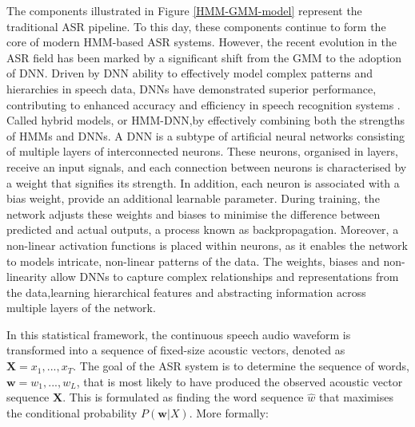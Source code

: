 The components illustrated in Figure \ref{HMM-GMM-model} represent the traditional \ac{ASR} pipeline. To this day, these components continue to form the core of modern \ac{HMM}-based \ac{ASR} systems. However, the recent evolution in the \ac{ASR} field has been marked by a significant shift from the \ac{GMM} to the adoption of \ac{DNN}. Driven by \ac{DNN} ability to effectively model complex patterns and hierarchies in speech data, \acp{DNN} have demonstrated superior performance, contributing to enhanced accuracy and efficiency in speech recognition systems \cite{hmm-dnn}. Called hybrid models, or \ac{HMM-DNN},by effectively combining both the strengths of \acp{HMM} and \acp{DNN}. A \ac{DNN} is a subtype of artificial neural networks consisting of multiple layers of interconnected neurons. These neurons, organised in layers, receive an input signals, and each connection between neurons is characterised by a weight that signifies its strength. In addition, each neuron is associated with a bias weight, provide an additional learnable parameter. During training, the network adjusts these weights and biases to minimise the difference between predicted and actual outputs, a process known as backpropagation. Moreover, a non-linear activation functions is placed within neurons, as it enables the network to models intricate, non-linear patterns of the data. The weights, biases and non-linearity allow \acp{DNN} to capture complex relationships and representations from the data,learning hierarchical features and abstracting information across multiple layers of the network.

In this statistical framework, the continuous speech audio waveform is transformed into a sequence of fixed-size acoustic vectors, denoted as $\boldsymbol{X}=x_1,...,x_T$. The goal of the \ac{ASR} system is to determine the sequence of words, $\boldsymbol{w}=w_1,...,w_L$, that is most likely to have produced the observed acoustic vector sequence $\boldsymbol{X}$. This is formulated as finding the word sequence $\hat{w}$ that maximises the conditional probability $P(\boldsymbol{w}|X)$. More formally:

